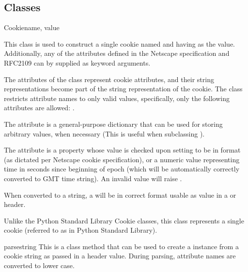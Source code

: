 \subsection{Classes\label{pyapi-cookie-classes}}

\begin{classdesc}{Cookie}{name, value}

  This class is used to construct a single cookie named 
  and having  as the value. Additionally, any of the 
  attributes defined in the Netscape specification and RFC2109 can by
  supplied as keyword arguments.

  The attributes of the class represent cookie attributes, and their
  string representations become part of the string representation of
  the cookie. The  class restricts attribute names to
  only valid values, specifically, only the following attributes are
  allowed: .

  The  attribute is a general-purpose dictionary that
  can be used for storing arbitrary values, when necessary (This is
  useful when subclassing ).

  The  attribute is a property whose value is checked
  upon setting to be in format 
  (as dictated per Netscape cookie specification), or a numeric value
  representing time in seconds since beginning of epoch (which will be
  automatically correctly converted to GMT time string). An invalid
   value will raise .

  When converted to a string, a  will be in correct
  format usable as value in a  or 
  header.

  \begin{notice}
    Unlike the Python Standard Library Cookie classes, this
    class represents a single cookie (referred to as  in
    Python Standard Library).
  \end{notice}

  \begin{methoddesc}[Cookie]{parse}{string}
    This is a class method that can be used to create a 
    instance from a cookie string  as passed in a header
    value. During parsing, attribute names are converted to lower
    case.


\end{methoddesc}
\end{classdesc}
